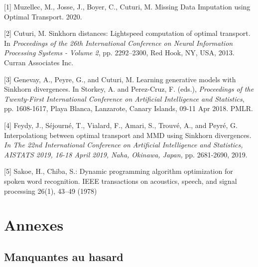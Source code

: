 \documentclass[acmsmall, natbib=false, nonacm]{acmart}
\begin{document}
\pagebreak
\begin{thebibliography}{99}


[1] Muzellec, M., Josse, J., Boyer, C., Cuturi, M. Missing Data Imputation using Optimal Transport. 2020.

[2] Cuturi, M. Sinkhorn distances: Lightspeed computation
of optimal transport. In \textit{Proceedings of the 26th International Conference on Neural Information Processing
Systems - Volume 2}, pp. 2292–2300, Red Hook, NY, USA,
2013. Curran Associates Inc.

[3] Genevay, A., Peyre, G., and Cuturi, M. Learning generative models with Sinkhorn divergences. In Storkey, A. and Perez-Cruz, F. (eds.),
\textit{Proceedings of the Twenty-First International Conference on Artificial Intelligence and Statistics}, 
pp. 1608-1617, Playa Blanca, Lanzarote, Canary Islands, 09-11 Apr 2018. PMLR. 


[4] Feydy, J., Séjourné, T., Vialard, F., Amari, S., Trouvé, A., and Peyré, G. Interpolationg between optimal transport and MMD using Sinkhorn divergences.
\textit{In The 22nd International Conference on Artificial Intelligence and Statistics,
AISTATS 2019, 16-18 April 2019, Naha, Okinawa, Japan,}
pp. 2681-2690, 2019.

[5] Sakoe, H., Chiba, S.: Dynamic programming algorithm optimization for spoken
word recognition. IEEE transactions on acoustics, speech, and signal processing
26(1), 43–49 (1978)

\end{thebibliography}

\pagebreak
\section{Annexes}
\subsection{Manquantes au hasard}
\end{document}
